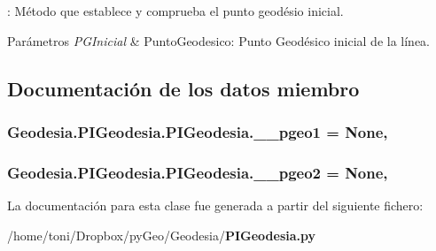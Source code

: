 \-: Método que establece y comprueba el punto geodésio inicial. 


\begin{DoxyParams}{Parámetros}
{\em P\-G\-Inicial} & Punto\-Geodesico\-: Punto Geodésico inicial de la línea. \\
\hline
\end{DoxyParams}


\subsection{Documentación de los datos miembro}
\subsubsection[{\-\_\-\-\_\-pgeo1}]{\setlength{\rightskip}{0pt plus 5cm}Geodesia.\-P\-I\-Geodesia.\-P\-I\-Geodesia.\-\_\-\-\_\-pgeo1 = None\hspace{0.3cm}{\ttfamily [static]}, {\ttfamily [private]}}\label{classGeodesia_1_1PIGeodesia_1_1PIGeodesia_a690c865c8d6ff73aca1d2df9c14003a2}
\subsubsection[{\-\_\-\-\_\-pgeo2}]{\setlength{\rightskip}{0pt plus 5cm}Geodesia.\-P\-I\-Geodesia.\-P\-I\-Geodesia.\-\_\-\-\_\-pgeo2 = None\hspace{0.3cm}{\ttfamily [static]}, {\ttfamily [private]}}\label{classGeodesia_1_1PIGeodesia_1_1PIGeodesia_a47900bf21b7bf837e5ba423890cdd6e8}


La documentación para esta clase fue generada a partir del siguiente fichero\-:\begin{DoxyCompactItemize}
\item 
/home/toni/\-Dropbox/py\-Geo/\-Geodesia/{\bf P\-I\-Geodesia.\-py}\end{DoxyCompactItemize}

